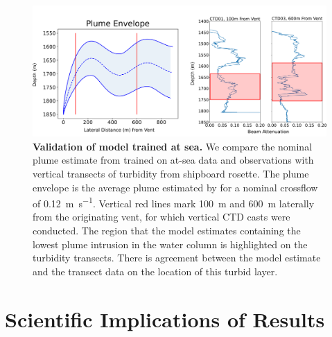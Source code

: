 \begin{figure}[h!]
    \centering
    \includegraphics[width=1\columnwidth]{figures/field_validation.png}
    \caption{\textbf{Validation of \PHUMES model trained at sea.} We compare the nominal plume estimate from \PHUMES trained on at-sea data and \Sentry observations with vertical transects of turbidity from shipboard rosette. The plume envelope is the average plume estimated by \PHUMES for a nominal crossflow of \SI{0.12}{\meter\per\second}. Vertical red lines mark \SI{100}{\meter} and \SI{600}{\meter} laterally from the originating vent, for which vertical CTD casts were conducted. The region that the model estimates containing the lowest plume intrusion in the water column is highlighted on the turbidity transects. There is agreement between the model estimate and the transect data on the location of this turbid layer.} 
    \label{fig:field_valid}
\end{figure}

\section{Scientific Implications of Results}

